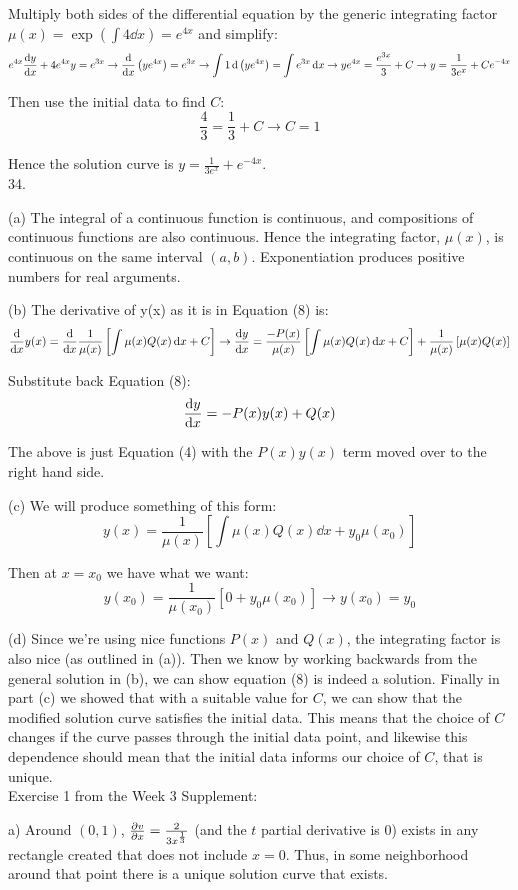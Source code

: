 \documentclass[11pt]{article}
\newcommand{\br}[1]{\left(#1\right)}
\newcommand{\sbr}[1]{\left[#1\right]}
\begin{document}
Multiply both sides of the differential equation by the generic integrating factor $\mu(x) = \exp\br{\int 4 \dd{x}} = e^{4x}$ and simplify:
$$e^{4x}\dv{y}{x} + 4e^{4x}y = e^{3x} \to \dv{x}\br{ye^{4x}} = e^{3x} \to \int 1 \dd{\br{ye^{4x}}} = \int e^{3x}\dd{x} \to ye^{4x} = \frac{e^{3x}}{3} + C \to y = \frac{1}{3e^x} +Ce^{-4x}$$

Then use the initial data to find $C$:
$$\frac{4}{3} = \frac{1}{3} +C \to C = 1$$

Hence the solution curve is $y = \frac{1}{3e^x} +e^{-4x}$.\\

34. 

(a) The integral of a continuous function is continuous, and compositions of continuous functions are also continuous. Hence the integrating factor, $\mu(x)$, is continuous on the same interval $(a,b)$. Exponentiation produces positive numbers for real arguments.

(b) The derivative of y(x) as it is in Equation (8) is:
$$\dv{x} y(x) = \dv{x} \frac{1}{\mu(x)}\sbr{\int \mu(x) Q(x)\dd{x} + C} \to \dv{y}{x} = \frac{-P(x)}{\mu(x)}\sbr{\int \mu(x) Q(x)\dd{x} + C} + \frac{1}{\mu(x)}\sbr{\mu(x) Q(x)}$$

Substitute back Equation (8):
$$\dv{y}{x} = -P(x)y(x) + Q(x)$$

The above is just Equation (4) with the $P(x)y(x)$ term moved over to the right hand side.

(c) We will produce something of this form:
$$y(x) = \frac{1}{\mu(x)}\sbr{\int \mu(x)Q(x)\dd{x} + y_0\mu(x_0)}$$

Then at $x= x_0$ we have what we want:
$$y(x_0) = \frac{1}{\mu(x_0)}\sbr{0 + y_0\mu(x_0)} \to y(x_0) = y_0$$

(d) Since we're using nice functions $P(x)$ and $Q(x)$, the integrating factor is also nice (as outlined in (a)). Then we know by working backwards from the general solution in (b), we can show equation (8) is indeed a solution. Finally in part (c) we showed that with a suitable value for $C$, we can show that the modified solution curve satisfies the initial data. This means that the choice of $C$ changes if the curve passes through the initial data point, and likewise this dependence should mean that the initial data informs our choice of $C$, that is unique. \\

Exercise 1 from the Week 3 Supplement:

a) Around $(0,1)$, $\pdv{v}{x} = \frac{2}{3x^{\frac{1}{3}}}$ (and the $t$ partial derivative is 0) exists in any rectangle created that does not include $x=0$. Thus, in some neighborhood around that point there is a unique solution curve that exists.
\end{document}

